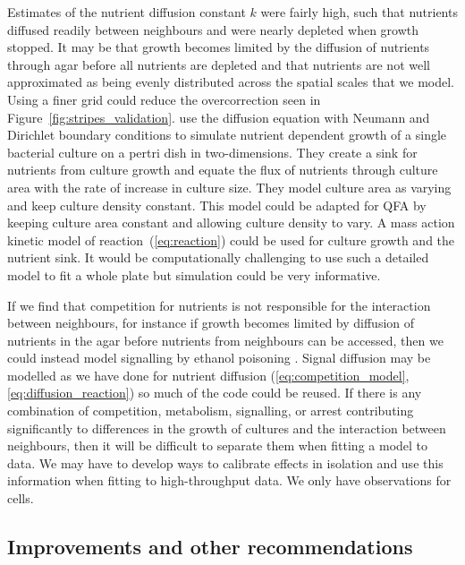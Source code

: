 Estimates of the nutrient diffusion constant \(k\) were fairly high,
such that nutrients diffused readily between neighbours and were
nearly depleted when growth stopped. It may be that growth becomes
limited by the diffusion of nutrients through agar before all
nutrients are depleted and that nutrients are not well approximated as
being evenly distributed across the spatial scales that we
model. Using a finer grid could reduce the overcorrection seen in
Figure~\ref{fig:stripes_validation}. \citet{Reo2014} use the diffusion
equation with Neumann and Dirichlet boundary conditions to simulate
nutrient dependent growth of a single bacterial culture on a pertri
dish in two-dimensions. They create a sink for nutrients from culture
growth and equate the flux of nutrients through culture area with the
rate of increase in culture size. They model culture area as varying
and keep culture density constant. This model could be adapted for QFA
by keeping culture area constant and allowing culture density to
vary. A mass action kinetic model of reaction~(\ref{eq:reaction})
could be used for culture growth and the nutrient sink. It would be
computationally challenging to use such a detailed model to fit a
whole plate but simulation could be very informative.

If we find that competition for nutrients is not responsible for the
interaction between neighbours, for instance if growth becomes limited
by diffusion of nutrients in the agar before nutrients from neighbours
can be accessed, then we could instead model signalling by ethanol
poisoning \citep{fujita2006}. Signal diffusion may be modelled as we
have done for nutrient diffusion
(\ref{eq:competition_model},\ref{eq:diffusion_reaction}) so much of
the code could be reused. If there is any combination of competition,
metabolism, signalling, or arrest contributing significantly to
differences in the growth of cultures and the interaction between
neighbours, then it will be difficult to separate them when fitting a
model to data. We may have to develop ways to calibrate effects in
isolation and use this information when fitting to high-throughput
data. We only have observations for cells.

\subsection{Improvements and other recommendations}

